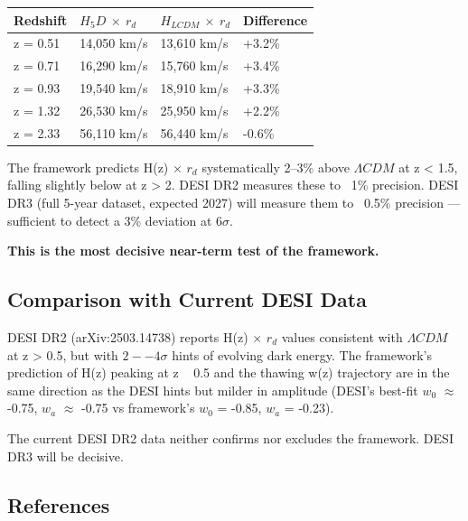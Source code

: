 \documentclass[aps,prd,preprint,superscriptaddress,longbibliography]{revtex4-2}
\begin{document}
\begin{table}[H]
\begin{ruledtabular}
\begin{tabular}{p{3.8cm}p{3.8cm}p{3.8cm}p{3.8cm}}
Redshift & $H_5D$ $\times$ $r_d$ & $H_{LCDM}$ $\times$ $r_d$ & Difference \\
\hline
z = 0.51 & 14,050 km/s & 13,610 km/s & +3.2\% \\
z = 0.71 & 16,290 km/s & 15,760 km/s & +3.4\% \\
z = 0.93 & 19,540 km/s & 18,910 km/s & +3.3\% \\
z = 1.32 & 26,530 km/s & 25,950 km/s & +2.2\% \\
z = 2.33 & 56,110 km/s & 56,440 km/s & -0.6\% \\
\end{tabular}
\end{ruledtabular}
\end{table}

The framework predicts H(z) $\times$ $r_d$ systematically 2--3\% above $\Lambda CDM$ at z < 1.5, falling slightly below at z > 2. DESI DR2 measures these to ~1\% precision. DESI DR3 (full 5-year dataset, expected 2027) will measure them to ~0.5\% precision --- sufficient to detect a 3\% deviation at $6\sigma$.

\textbf{This is the most decisive near-term test of the framework.}



\subsection{Comparison with Current DESI Data}

DESI DR2 (arXiv:2503.14738) reports H(z) $\times$ $r_d$ values consistent with $\Lambda CDM$ at z > 0.5, but with $2--4\sigma$ hints of evolving dark energy. The framework's prediction of H(z) peaking at z ~ 0.5 and the thawing w(z) trajectory are in the same direction as the DESI hints but milder in amplitude (DESI's best-fit $w_{0}$ $\approx$ -0.75, $w_a$ $\approx$ -0.75 vs framework's $w_{0}$ = -0.85, $w_a$ = -0.23).

The current DESI DR2 data neither confirms nor excludes the framework. DESI DR3 will be decisive.



\subsection{References}
\end{document}
